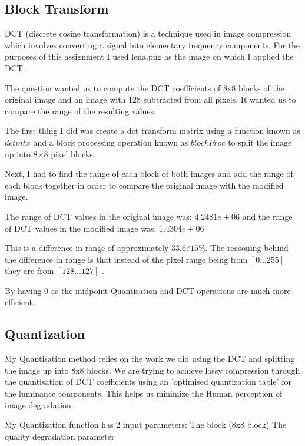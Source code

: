 \documentclass[]{assignment}
\begin{document}

\subsection{Block Transform} 

DCT (discrete cosine transformation) is a technique used in image compression which involves converting a signal into elementary frequency components. For the purposes of this assignment I used lena.png as the image on which I applied the DCT. 

The question wanted us to compute the DCT coefficients of 8x8 blocks of the original image and an image with 128 subtracted from all pixels. It wanted us to compare the range of the resulting values.



The first thing I did was create a dct transform matrix using a function known as $dctmtx$ and a block processing operation known as $blockProc$ to split the image up into 8$\times$8 pixel blocks. 

Next, I had to find the range of each block of both images and add the range of each block together in order to compare the original image with the modified image. 

The range of DCT values in the original image was: $4.2481e+06$
and the range of DCT values in the modified image was: $ 1.4304e+06 $

This is a difference in range of approximately $33.6715\%$. The reasoning behind the difference in range is that instead of the pixel range being from $[0\ldots 255]$ they are from $[128\ldots 127]$ .

By having 0 as the midpoint Quantisation and DCT operations are much more efficient.

\clearpage

\subsection{Quantization} 

My Quantisation method relies on the work we did using the DCT and splitting the image up into 8x8 blocks. We are trying to achieve lossy compression through the quantisation of DCT coefficients using an 'optimised quantization table' for the luminance components. This helps us minimize the Human perception of image degradation. 



My Quantization function has 2 input parameters:
\bin
\bb The block (8x8 block)
\bb The quality degradation parameter
\ein
\end{document}

